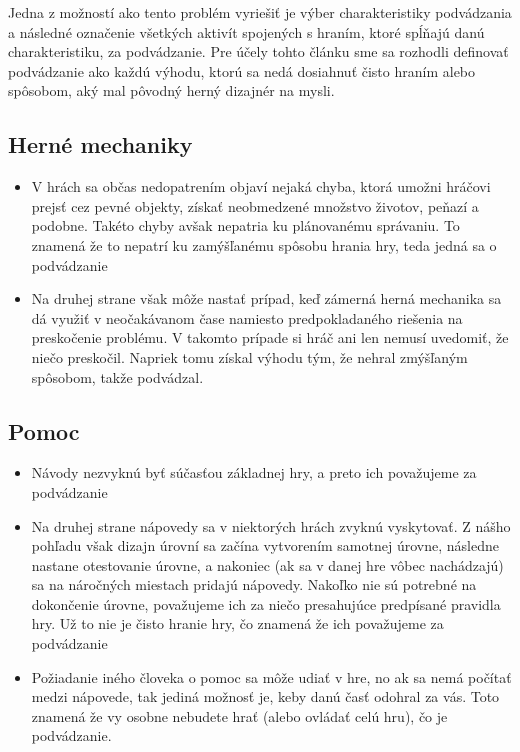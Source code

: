 \documentclass[10pt,twoside,slovak,a4paper]{article}
\begin{document}
Jedna z možností ako tento problém vyriešiť je výber charakteristiky podvádzania a následné označenie všetkých aktivít spojených s hraním, ktoré spĺňajú danú charakteristiku, za podvádzanie. Pre účely tohto článku sme sa rozhodli definovať podvádzanie ako každú výhodu, ktorú sa nedá dosiahnuť čisto hraním alebo spôsobom, aký mal pôvodný herný dizajnér na mysli.

\subsection{Herné mechaniky}
\begin{itemize}
\item V hrách sa občas nedopatrením objaví nejaká chyba, ktorá umožni hráčovi prejsť cez pevné objekty, získať neobmedzené množstvo životov, peňazí a podobne. Takéto chyby avšak nepatria ku plánovanému správaniu. To znamená že to nepatrí ku zamýšľanému spôsobu hrania hry, teda jedná sa o podvádzanie

\item Na druhej strane však môže nastať prípad, keď zámerná herná mechanika sa dá využiť v neočakávanom čase namiesto predpokladaného riešenia na preskočenie problému. V takomto prípade si hráč ani len nemusí uvedomiť, že niečo preskočil. Napriek tomu získal výhodu tým, že nehral zmýšľaným spôsobom, takže podvádzal.
\end{itemize}

\subsection{Pomoc}
\begin{itemize}
\item Návody nezvyknú byť súčasťou základnej hry, a preto ich považujeme za podvádzanie
\item Na druhej strane nápovedy sa v niektorých hrách zvyknú vyskytovať. Z nášho pohľadu však dizajn úrovní sa začína vytvorením samotnej úrovne, následne nastane otestovanie úrovne, a nakoniec (ak sa v danej hre vôbec nachádzajú) sa na náročných miestach pridajú nápovedy. Nakoľko nie sú potrebné na dokončenie úrovne, považujeme ich za niečo presahujúce predpísané pravidla hry. Už to nie je čisto hranie hry, čo znamená že ich považujeme za podvádzanie
\item Požiadanie iného človeka o pomoc sa môže udiať v hre, no ak sa nemá počítať medzi nápovede, tak jediná možnosť je, keby danú časť odohral za vás. Toto znamená že vy osobne nebudete hrať (alebo ovládať celú hru), čo je podvádzanie.
\end{itemize}
\end{document}
